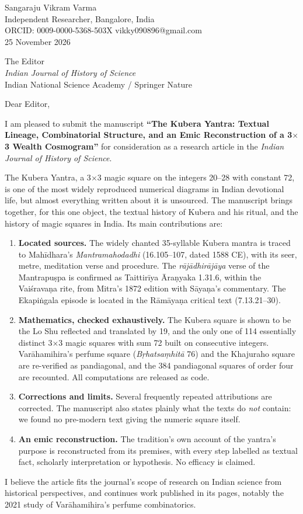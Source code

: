 \documentclass[11pt]{article}
\begin{document}
Sangaraju Vikram Varma\\
Independent Researcher, Bangalore, India\\
ORCID: 0009-0000-5368-503X \textperiodcentered{} vikky090896@gmail.com\\

25 November 2026

The Editor\\
\emph{Indian Journal of History of Science}\\
Indian National Science Academy / Springer Nature

Dear Editor,

I am pleased to submit the manuscript \textbf{``The Kubera Yantra: Textual Lineage, Combinatorial Structure, and an Emic Reconstruction of a 3$\times$3 Wealth Cosmogram''} for consideration as a research article in the \emph{Indian Journal of History of Science}.

The Kubera Yantra, a 3$\times$3 magic square on the integers 20--28 with constant 72, is one of the most widely reproduced numerical diagrams in Indian devotional life, but almost everything written about it is unsourced. The manuscript brings together, for this one object, the textual history of Kubera and his ritual, and the history of magic squares in India. Its main contributions are:

\begin{enumerate}
\item \textbf{Located sources.} The widely chanted 35-syllable Kubera mantra is traced to Mahīdhara's \emph{Mantramahodadhi} (16.105--107, dated 1588 CE), with its seer, metre, meditation verse and procedure. The \emph{rājādhirājāya} verse of the Mantrapuṣpa is confirmed as Taittirīya Āraṇyaka 1.31.6, within the Vaiśravaṇa rite, from Mitra's 1872 edition with Sāyaṇa's commentary. The Ekapiṅgala episode is located in the Rāmāyaṇa critical text (7.13.21--30).
\item \textbf{Mathematics, checked exhaustively.} The Kubera square is shown to be the Lo Shu reflected and translated by 19, and the only one of 114 essentially distinct 3$\times$3 magic squares with sum 72 built on consecutive integers. Varāhamihira's perfume square (\emph{Bṛhatsaṃhitā} 76) and the Khajuraho square are re-verified as pandiagonal, and the 384 pandiagonal squares of order four are recounted. All computations are released as code.
\item \textbf{Corrections and limits.} Several frequently repeated attributions are corrected. The manuscript also states plainly what the texts do \emph{not} contain: we found no pre-modern text giving the numeric square itself.
\item \textbf{An emic reconstruction.} The tradition's own account of the yantra's purpose is reconstructed from its premises, with every step labelled as textual fact, scholarly interpretation or hypothesis. No efficacy is claimed.
\end{enumerate}
I believe the article fits the journal's scope of research on Indian science from historical perspectives, and continues work published in its pages, notably the 2021 study of Varāhamihira's perfume combinatorics.
\end{document}
